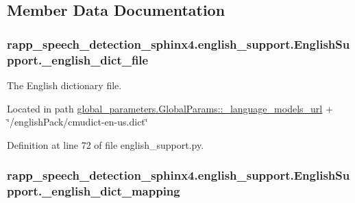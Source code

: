 \subsection{Member Data Documentation}
\hypertarget{classrapp__speech__detection__sphinx4_1_1english__support_1_1EnglishSupport_a82ada1f7e06781ca0bd75c41319433f3}{
\subsubsection[{\-\_\-english\-\_\-dict\-\_\-file}]{\setlength{\rightskip}{0pt plus 5cm}rapp\-\_\-speech\-\_\-detection\-\_\-sphinx4.\-english\-\_\-support.\-English\-Support.\-\_\-english\-\_\-dict\-\_\-file\hspace{0.3cm}{\ttfamily [private]}}}\label{classrapp__speech__detection__sphinx4_1_1english__support_1_1EnglishSupport_a82ada1f7e06781ca0bd75c41319433f3}


The English dictionary file. 

Located in path \hyperlink{classrapp__speech__detection__sphinx4_1_1global__parameters_1_1GlobalParams_a669e25ce189ad6cae67f52ebeb3404c7}{global\-\_\-parameters.\-Global\-Params\-::\-\_\-language\-\_\-models\-\_\-url} + \char`\"{}/english\-Pack/cmudict-\/en-\/us.\-dict\char`\"{} 

Definition at line 72 of file english\-\_\-support.\-py.

\hypertarget{classrapp__speech__detection__sphinx4_1_1english__support_1_1EnglishSupport_adaabe1ce40092eef99be9c2eec178f8d}{
\subsubsection[{\-\_\-english\-\_\-dict\-\_\-mapping}]{\setlength{\rightskip}{0pt plus 5cm}rapp\-\_\-speech\-\_\-detection\-\_\-sphinx4.\-english\-\_\-support.\-English\-Support.\-\_\-english\-\_\-dict\-\_\-mapping\hspace{0.3cm}{\ttfamily [private]}}}\label{classrapp__speech__detection__sphinx4_1_1english__support_1_1EnglishSupport_adaabe1ce40092eef99be9c2eec178f8d}


